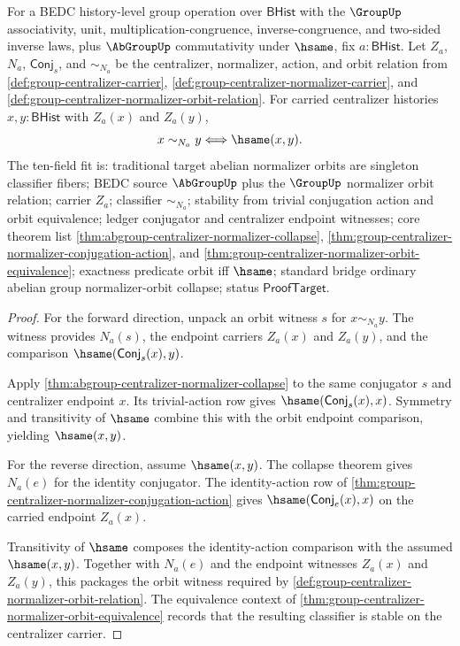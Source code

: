 \begin{theorem}
\label{thm:abgroup-centralizer-normalizer-orbit-collapse}
For a BEDC history-level group operation over $\mathsf{BHist}$ with the
$\GroupUp$ associativity, unit, multiplication-congruence,
inverse-congruence, and two-sided inverse laws, plus $\AbGroupUp$
commutativity under $\hsame$, fix $a:\mathsf{BHist}$. Let $Z_a$, $N_a$,
$\mathsf{Conj}_s$, and $\sim_{N_a}$ be the centralizer, normalizer, action,
and orbit relation from \autoref{def:group-centralizer-carrier},
\autoref{def:group-centralizer-normalizer-carrier}, and
\autoref{def:group-centralizer-normalizer-orbit-relation}. For carried
centralizer histories $x,y:\mathsf{BHist}$ with $Z_a(x)$ and $Z_a(y)$,
$$
x\sim_{N_a}y \Longleftrightarrow \hsame(x,y).
$$
The ten-field fit is: traditional target abelian normalizer orbits are
singleton classifier fibers; BEDC source $\AbGroupUp$ plus the $\GroupUp$
normalizer orbit relation; carrier $Z_a$; classifier $\sim_{N_a}$; stability
from trivial conjugation action and orbit equivalence; ledger conjugator and
centralizer endpoint witnesses; core theorem list
\autoref{thm:abgroup-centralizer-normalizer-collapse},
\autoref{thm:group-centralizer-normalizer-conjugation-action}, and
\autoref{thm:group-centralizer-normalizer-orbit-equivalence}; exactness
predicate orbit iff $\hsame$; standard bridge ordinary abelian group
normalizer-orbit collapse; status $\mathsf{ProofTarget}$.
\end{theorem}
\begin{proof}
For the forward direction, unpack an orbit witness $s$ for
$x\sim_{N_a}y$. The witness provides $N_a(s)$, the endpoint carriers
$Z_a(x)$ and $Z_a(y)$, and the comparison
$\hsame(\mathsf{Conj}_s(x),y)$.

Apply \autoref{thm:abgroup-centralizer-normalizer-collapse} to the same
conjugator $s$ and centralizer endpoint $x$. Its trivial-action row gives
$\hsame(\mathsf{Conj}_s(x),x)$. Symmetry and transitivity of $\hsame$ combine
this with the orbit endpoint comparison, yielding $\hsame(x,y)$.

For the reverse direction, assume $\hsame(x,y)$. The collapse theorem gives
$N_a(e)$ for the identity conjugator. The identity-action row of
\autoref{thm:group-centralizer-normalizer-conjugation-action} gives
$\hsame(\mathsf{Conj}_e(x),x)$ on the carried endpoint $Z_a(x)$.

Transitivity of $\hsame$ composes the identity-action comparison with the
assumed $\hsame(x,y)$. Together with $N_a(e)$ and the endpoint witnesses
$Z_a(x)$ and $Z_a(y)$, this packages the orbit witness required by
\autoref{def:group-centralizer-normalizer-orbit-relation}. The equivalence
context of \autoref{thm:group-centralizer-normalizer-orbit-equivalence}
records that the resulting classifier is stable on the centralizer carrier.
\end{proof}

